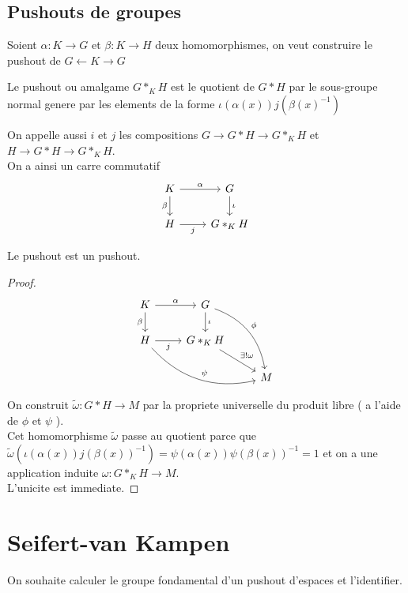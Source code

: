 \documentclass[../main.tex]{subfiles}
\begin{document}
\subsection{Pushouts de groupes}
Soient $\alpha:K\to G$ et $\beta:K\to H$ deux homomorphismes, on veut construire le pushout de $G\leftarrow K \rightarrow G $ 
\begin{defn}[Pushout]
	Le pushout ou amalgame $G \ast_K H$ est le quotient de $G\ast H$ par le sous-groupe normal genere par les elements de la forme $\iota( \alpha( x) ) j( \beta( x) ^{-1} )$ 
\end{defn}
On appelle aussi $i$ et $j$ les compositions $G\to G\ast H \to G\ast_K H$ et $H \to G\ast H \to G\ast_K H$.\\
On a ainsi un carre commutatif
\[\begin{tikzcd}
	K & G \\
	H & {G\ast_K H}
	\arrow["\beta"', from=1-1, to=2-1]
	\arrow["\alpha", from=1-1, to=1-2]
	\arrow["\iota", from=1-2, to=2-2]
	\arrow["j"', from=2-1, to=2-2]
\end{tikzcd}\]
\begin{propo}
Le pushout est un pushout.
\end{propo}
\begin{proof}
\[\begin{tikzcd}
	K & G \\
	H & {G\ast_K H} \\
	&& M
	\arrow["\beta"', from=1-1, to=2-1]
	\arrow["\alpha", from=1-1, to=1-2]
	\arrow["\iota", from=1-2, to=2-2]
	\arrow["j"', from=2-1, to=2-2]
	\arrow["\psi", bend right, from=2-1, to=3-3]
	\arrow["\phi", bend left, from=1-2, to=3-3]
	\arrow["{\exists! \omega}", from=2-2, to=3-3]
\end{tikzcd}\]
On construit $\tilde\omega: G\ast H \to M$ par la propriete universelle du produit libre ( a l'aide de $\phi$ et $\psi$ ).\\
Cet homomorphisme  $\tilde \omega$ passe au quotient parce que  $\tilde\omega( \iota( \alpha( x) ) j( \beta( x) ) ^{-1}) = \psi( \alpha( x) ) \psi( \beta( x) ) ^{-1}= 1$ et on a une application induite $\omega: G\ast_K H \to M$.\\
L'unicite est immediate.
\end{proof}
\section{Seifert-van Kampen}
On souhaite calculer le groupe fondamental d'un pushout d'espaces et l'identifier.
\end{document}
